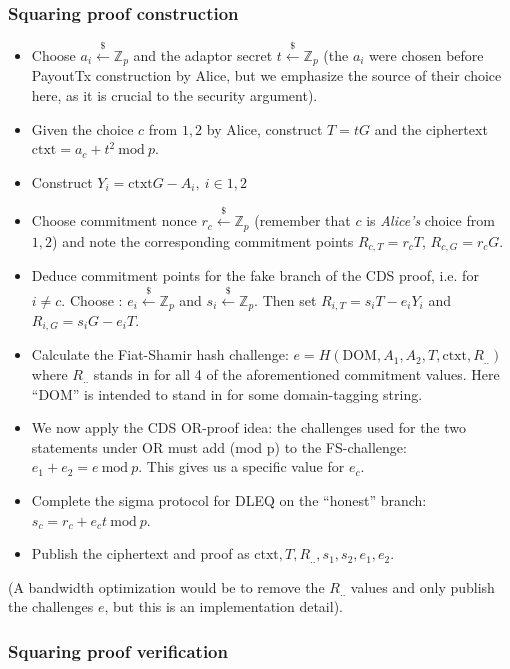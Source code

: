 \documentclass[11pt]{article}
\begin{document}
\subsubsection{Squaring proof construction}

\begin{itemize}
\item Choose $a_i \stackrel{\$}{\leftarrow} \mathbb{Z}_p$ and the adaptor secret $t \stackrel{\$}{\leftarrow} \mathbb{Z}_p$ (the $a_i$ were chosen before PayoutTx construction by Alice, but we emphasize the source of their choice here, as it is crucial to the security argument).
\item Given the choice $c$ from $1,2$ by Alice, construct $T = tG$ and the ciphertext $\textrm{ctxt} = a_c + t^2\ \textrm{mod}\ p$.
\item Construct $Y_i = \textrm{ctxt}G - A_i,\ i \in 1,2$
\item Choose commitment nonce $r_c \stackrel{\$}{\leftarrow} \mathbb{Z}_p$ (remember that $c$ is \emph{Alice's} choice from $1,2$) and note the corresponding commitment points $R_{c,T} = r_c T$, $R_{c,G} = r_c G$.
\item Deduce commitment points for the fake branch of the CDS proof, i.e. for $i \ne c$. Choose : $e_i \stackrel{\$}{\leftarrow} \mathbb{Z}_p$ and $s_i \stackrel{\$}{\leftarrow} \mathbb{Z}_p$. Then set $R_{i,T} = s_i T - e_i Y_i$ and $R_{i,G} = s_i G - e_i T$.
\item Calculate the Fiat-Shamir hash challenge: $e = H(\textrm{DOM}, A_1, A_2, T, \textrm{ctxt}, R_{..})$ where $R_{..}$ stands in for all 4 of the aforementioned commitment values. Here ``DOM'' is intended to stand in for some domain-tagging string.
\item We now apply the CDS OR-proof idea: the challenges used for the two statements under OR must add (mod p) to the FS-challenge: $e_1 + e_2 = e\ \textrm{mod}\ p$. This gives us a specific value for $e_c$.
\item Complete the sigma protocol for DLEQ on the ``honest'' branch: $s_c = r_c + e_c t\ \textrm{mod}\ p$.
\item Publish the ciphertext and proof as $\textrm{ctxt}, T, R_{..}, s_1, s_2, e_1, e_2$.
\end{itemize}

(A bandwidth optimization would be to remove the $R_{..}$ values and only publish the challenges $e$, but this is an implementation detail).

\subsubsection{Squaring proof verification}
\end{document}
